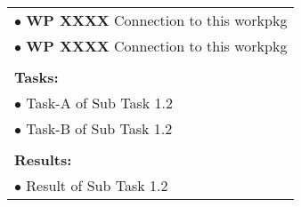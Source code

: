 \begin{table}[!h]
\begin{center}
\begin{tabular}{|p{}||p{}|p{}||p{}|}
            \multicolumn{4}{|p{.95\columnwidth}|}{$\bullet$ \textbf{WP XXXX} Connection to this workpkg}\\
            \multicolumn{4}{|p{.95\columnwidth}|}{$\bullet$ \textbf{WP XXXX} Connection to this workpkg}\\
            \multicolumn{4}{|p{.95\columnwidth}|}{}\\
            \multicolumn{4}{|p{.95\columnwidth}|}{\textbf{Tasks:}}\\
            \multicolumn{4}{|p{.95\columnwidth}|}{$\bullet$ Task-A of Sub Task 1.2}\\
            \multicolumn{4}{|p{.95\columnwidth}|}{$\bullet$ Task-B of Sub Task 1.2}\\
            \multicolumn{4}{|p{.95\columnwidth}|}{}\\
            \multicolumn{4}{|p{.95\columnwidth}|}{\textbf{Results:}}\\
            \multicolumn{4}{|p{.95\columnwidth}|}{$\bullet$ Result of Sub Task 1.2}\\
            \hline
        \end{tabular}
    \end{center}
\end{table}

\clearpage

